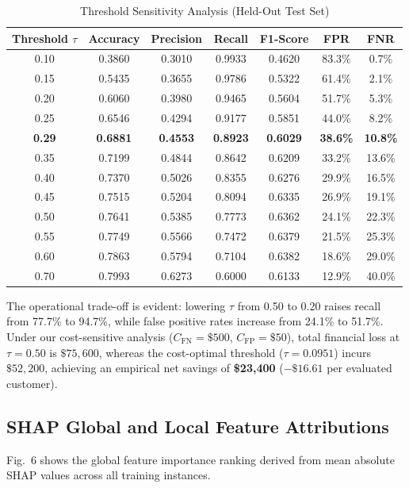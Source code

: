 \documentclass[conference]{IEEEtran}
\begin{document}
\begin{table}[htbp]
\caption{Threshold Sensitivity Analysis (Held-Out Test Set)}
\label{tab:threshold_analysis}
\centering
\begin{tabular}{ccccccc}
\toprule
\textbf{Threshold $\tau$} & \textbf{Accuracy} & \textbf{Precision} & \textbf{Recall} & \textbf{F1-Score} & \textbf{FPR} & \textbf{FNR} \\
\midrule
0.10 & 0.3860 & 0.3010 & 0.9933 & 0.4620 & 83.3\% & 0.7\% \\
0.15 & 0.5435 & 0.3655 & 0.9786 & 0.5322 & 61.4\% & 2.1\% \\
0.20 & 0.6060 & 0.3980 & 0.9465 & 0.5604 & 51.7\% & 5.3\% \\
0.25 & 0.6546 & 0.4294 & 0.9177 & 0.5851 & 44.0\% & 8.2\% \\
\textbf{0.29} & \textbf{0.6881} & \textbf{0.4553} & \textbf{0.8923} & \textbf{0.6029} & \textbf{38.6\%} & \textbf{10.8\%} \\
0.35 & 0.7199 & 0.4844 & 0.8642 & 0.6209 & 33.2\% & 13.6\% \\
0.40 & 0.7370 & 0.5026 & 0.8355 & 0.6276 & 29.9\% & 16.5\% \\
0.45 & 0.7515 & 0.5204 & 0.8094 & 0.6335 & 26.9\% & 19.1\% \\
0.50 & 0.7641 & 0.5385 & 0.7773 & 0.6362 & 24.1\% & 22.3\% \\
0.55 & 0.7749 & 0.5566 & 0.7472 & 0.6379 & 21.5\% & 25.3\% \\
0.60 & 0.7863 & 0.5794 & 0.7104 & 0.6382 & 18.6\% & 29.0\% \\
0.70 & 0.7993 & 0.6273 & 0.6000 & 0.6133 & 12.9\% & 40.0\% \\
\bottomrule
\end{tabular}
\end{table}

The operational trade-off is evident: lowering $\tau$ from 0.50 to 0.20 raises recall from 77.7\% to 94.7\%, while false positive rates increase from 24.1\% to 51.7\%. Under our cost-sensitive analysis ($C_{\text{FN}}=\$500$, $C_{\text{FP}}=\$50$), total financial loss at $\tau=0.50$ is $\$75,600$, whereas the cost-optimal threshold ($\tau=0.0951$) incurs $\$52,200$, achieving an empirical net savings of \textbf{\$23,400} ($-\$16.61$ per evaluated customer).

\subsection{SHAP Global and Local Feature Attributions}
Fig.~6 shows the global feature importance ranking derived from mean absolute SHAP values across all training instances.
\end{document}

